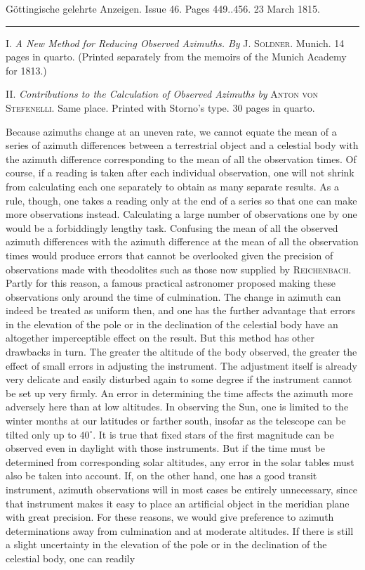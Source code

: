 \clearpage
{}
\begin{center}\small Göttingische gelehrte Anzeigen. Issue 46. Pages 449..456. 23 March 1815.\\[3pt]\rule{.72\linewidth}{.3pt}\end{center}

I. \emph{A New Method for Reducing Observed Azimuths. By} J. \textsc{Soldner}. Munich. 14 pages in quarto. (Printed separately from the memoirs of the Munich Academy for 1813.)

II. \emph{Contributions to the Calculation of Observed Azimuths by} \textsc{Anton von Stefenelli}. Same place. Printed with Storno's type. 30 pages in quarto.

Because azimuths change at an uneven rate, we cannot equate the mean of a series of azimuth differences between a terrestrial object and a celestial body with the azimuth difference corresponding to the mean of all the observation times. Of course, if a reading is taken after each individual observation, one will not shrink from calculating each one separately to obtain as many separate results. As a rule, though, one takes a reading only at the end of a series so that one can make more observations instead. Calculating a large number of observations one by one would be a forbiddingly lengthy task. Confusing the mean of all the observed azimuth differences with the azimuth difference at the mean of all the observation times would produce errors that cannot be overlooked given the precision of observations made with theodolites such as those now supplied by \textsc{Reichenbach}. Partly for this reason, a famous practical astronomer proposed making these observations only around the time of culmination. The change in azimuth can indeed be treated as uniform then, and one has the further advantage that errors in the elevation of the pole or in the declination of the celestial body have an altogether imperceptible effect on the result. But this method has other drawbacks in turn. The greater the altitude of the body observed, the greater the effect of small errors in adjusting the instrument. The adjustment itself is already very delicate and easily disturbed again to some degree if the instrument cannot be set up very firmly. An error in determining the time affects the azimuth more adversely here than at low altitudes. In observing the Sun, one is limited to the winter months at our latitudes or farther south, insofar as the telescope can be tilted only up to $40^{\circ}$. It is true that fixed stars of the first magnitude can be observed even in daylight with those instruments. But if the time must be determined from corresponding solar altitudes, any error in the solar tables must also be taken into account. If, on the other hand, one has a good transit instrument, azimuth observations will in most cases be entirely unnecessary, since that instrument makes it easy to place an artificial object in the meridian plane with great precision. For these reasons, we would give preference to azimuth determinations away from culmination and at moderate altitudes. If there is still a slight uncertainty in the elevation of the pole or in the declination of the celestial body, one can readily 